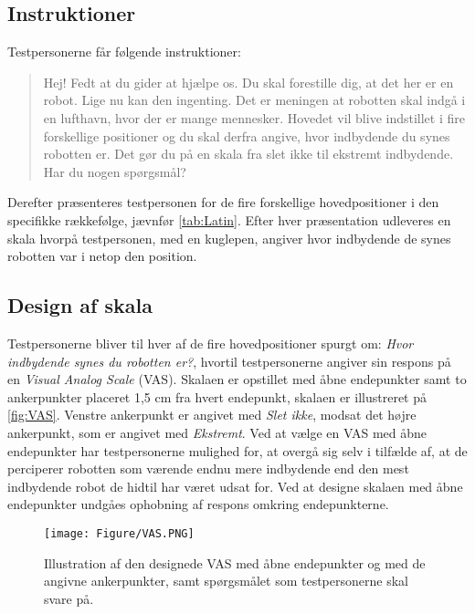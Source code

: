 \subsection{Instruktioner}
\label{SkaleringseksperimentInstruktioner}
%
Testpersonerne får følgende instruktioner: 
%
\begin{quotation}
\noindent
Hej!\blankline
%
Fedt at du gider at hjælpe os. Du skal forestille dig, at det her er en robot. Lige nu kan den ingenting. Det er meningen at robotten skal indgå i en lufthavn, hvor der er mange mennesker. Hovedet vil blive indstillet i fire forskellige positioner og du skal derfra angive, hvor indbydende du synes robotten er. Det gør du på en skala fra slet ikke til ekstremt indbydende.\blankline
%
Har du nogen spørgsmål?
\end{quotation}
%
Derefter præsenteres testpersonen for de fire forskellige hovedpositioner i den specifikke rækkefølge, jævnfør \autoref{tab:Latin}. Efter hver præsentation udleveres en skala hvorpå testpersonen, med en kuglepen, angiver hvor indbydende de synes robotten var i netop den position.  
%

\subsection{Design af skala}
\label{SkaleringseksperimentDesignAfSkala}
%
Testpersonerne bliver til hver af de fire hovedpositioner spurgt om: \textit{Hvor indbydende synes du robotten er?}, hvortil testpersonerne angiver sin respons på en \textit{Visual Analog Scale} (VAS). Skalaen er opstillet med åbne endepunkter samt to ankerpunkter placeret 1,5 cm fra hvert endepunkt, skalaen er illustreret på \autoref{fig:VAS}. Venstre ankerpunkt er angivet med \textit{Slet ikke}, modsat det højre ankerpunkt, som er angivet med \textit{Ekstremt}. Ved at vælge en VAS med åbne endepunkter har testpersonerne mulighed for, at overgå sig selv i tilfælde af, at de perciperer robotten som værende endnu mere indbydende end den mest indbydende robot de hidtil har været udsat for. Ved at designe skalaen med åbne endepunkter undgåes ophobning af respons omkring endepunkterne. 
%
\begin{figure}[H]
\centering
\texttt{[image: Figure/VAS.PNG]} 
\caption{Illustration af den designede VAS med åbne endepunkter og med de angivne ankerpunkter, samt spørgsmålet som testpersonerne skal svare på.}
\label{fig:VAS}
\end{figure}
\noindent 
%